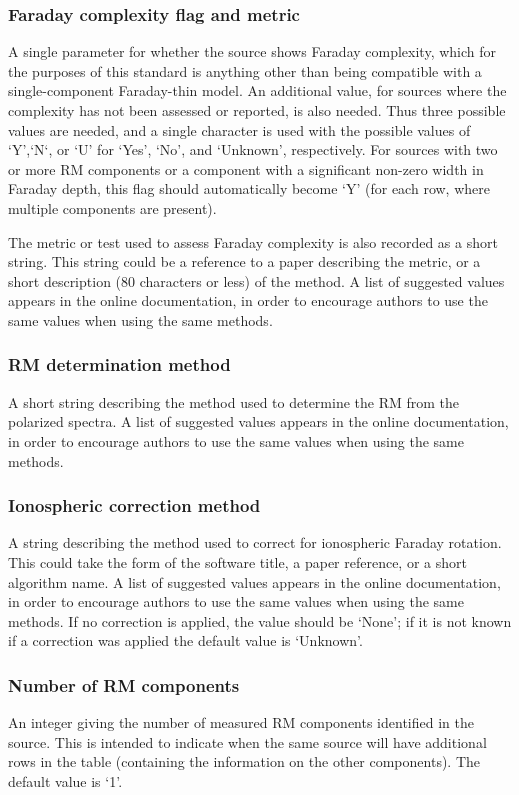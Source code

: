 \documentclass[10pt,modern]{aastex63}
\begin{document}
\subsubsection{Faraday complexity flag and metric}
A single parameter for whether the source shows Faraday complexity, which for the purposes of this standard is anything other than being compatible with a single-component Faraday-thin model. An additional value, for sources where the complexity has not been assessed or reported, is also needed. Thus three possible values are needed, and a single character is used with the possible values of `Y',`N`, or `U' for `Yes', `No', and `Unknown', respectively. For sources with two or more RM components or a component with a significant non-zero width in Faraday depth, this flag should automatically become `Y' (for each row, where multiple components are present).

The metric or test used to assess Faraday complexity is also recorded as a short string. This string could be a reference to a paper describing the metric, or a short description (80 characters or less) of the method. A list of suggested values appears in the online documentation, in order to encourage authors to use the same values when using the same methods.

\subsubsection{RM determination method}
A short string describing the method used to determine the RM from the polarized spectra. A list of suggested values appears in the online documentation, in order to encourage authors to use the same values when using the same methods.

\subsubsection{Ionospheric correction method}
A string describing the method used to correct for ionospheric Faraday rotation. This could take the form of the software title, a paper reference, or a short algorithm name. A list of suggested values appears in the online documentation, in order to encourage authors to use the same values when using the same methods. If no correction is applied, the value should be `None'; if it is not known if a correction was applied the default value is `Unknown'.

\subsubsection{Number of RM components}
An integer giving the number of measured RM components identified in the source. This is intended to indicate when the same source will have additional rows in the table (containing the information on the other components). The default value is `1'.
\end{document}
